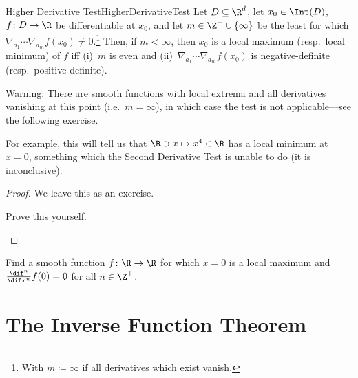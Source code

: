 \begin{thm}{Higher Derivative Test}{HigherDerivativeTest}
Let $D\subseteq \R ^d$, let $x_0\in \Int (D)$, $f\colon D\rightarrow \R$ be differentiable at $x_0$, and let $m\in \Z ^+\cup \{ \infty \}$ be the least for which $\nabla _{a_1}\cdots \nabla _{a_m}f(x_0)\neq 0$.\footnote{With $m\coloneqq \infty$ if all derivatives which exist vanish.}  Then, if $m<\infty$, then $x_0$ is a local maximum (resp.~local minimum) of $f$ iff (i)~$m$ is even and (ii)~$\nabla _{a_1}\cdots \nabla _{a_m}f(x_0)$ is negative-definite (resp.~positive-definite).
\begin{wrn}
Warning:  There are smooth functions with local extrema and all derivatives vanishing at this point (i.e.~$m=\infty$), in which case the test is not applicable---see the following exercise.
\end{wrn}
\begin{rmk}
For example, this will tell us that $\R \ni x\mapsto x^4\in \R$ has a local minimum at $x=0$, something which the Second Derivative Test is unable to do (it is inconclusive).
\end{rmk}
\begin{proof}
We leave this as an exercise.
\begin{exr}[breakable=false]{}{}
Prove this yourself.
\end{exr}
\end{proof}
\end{thm}
\begin{exr}{}{}
Find a smooth function $f\colon \R \rightarrow \R$ for which $x=0$ is a local maximum and $\frac{\dif ^n}{\dif x^n}f(0)=0$ for all $n\in \Z ^+$.
\end{exr}

\section{The Inverse Function Theorem}

